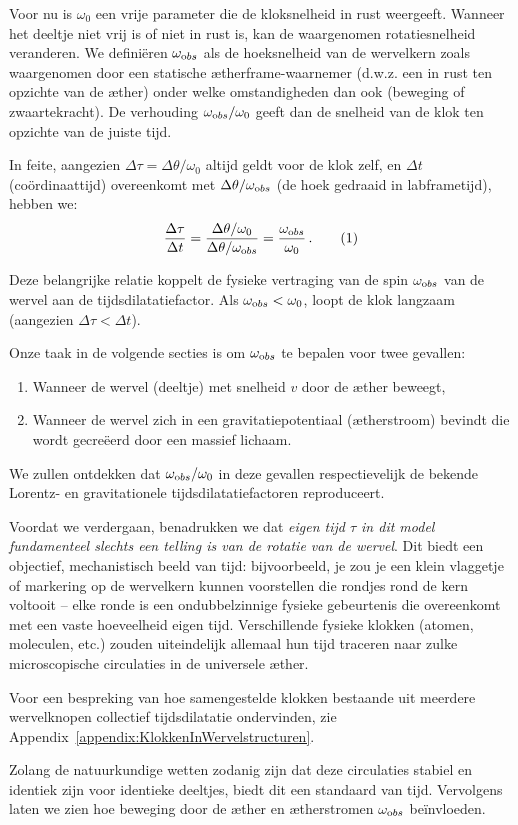 Voor nu is $\omega_0$ een vrije parameter die de kloksnelheid in rust weergeeft. Wanneer het deeltje niet vrij is of niet in rust is, kan de waargenomen rotatiesnelheid veranderen. We definiëren $\omega_{\textrm obs}$ als de hoeksnelheid van de wervelkern zoals waargenomen door een statische ætherframe-waarnemer (d.w.z. een in rust ten opzichte van de æther) onder welke omstandigheden dan ook (beweging of zwaartekracht). De verhouding $\omega_{\textrm obs}/\omega_0$ geeft dan de snelheid van de klok ten opzichte van de juiste tijd.

In feite, aangezien $\Delta \tau = \Delta \theta / \omega_0$ altijd geldt voor de klok zelf, en $\Delta t$ (coördinaattijd) overeenkomt met $\Delta \theta / \omega_{\textrm obs}$ (de hoek gedraaid in labframetijd), hebben we:
\[
    \frac{\Delta \tau}{\Delta t} = \frac{\Delta \theta / \omega_0}{\Delta \theta / \omega_{\textrm obs}} = \frac{\omega_{\textrm obs}}{\omega_0} \,. \tag{1}
\]

Deze belangrijke relatie koppelt de fysieke vertraging van de spin $\omega_{\textrm obs}$ van de wervel aan de tijdsdilatatiefactor. Als $\omega_{\textrm obs} < \omega_0$, loopt de klok langzaam (aangezien $\Delta \tau < \Delta t$).

Onze taak in de volgende secties is om $\omega_{\textrm obs}$ te bepalen voor twee gevallen:
\begin{enumerate}
    \item Wanneer de wervel (deeltje) met snelheid $v$ door de æther beweegt,
    \item Wanneer de wervel zich in een gravitatiepotentiaal (ætherstroom) bevindt die wordt gecreëerd door een massief lichaam.
\end{enumerate}
We zullen ontdekken dat $\omega_{\textrm obs}/\omega_0$ in deze gevallen respectievelijk de bekende Lorentz- en gravitationele tijdsdilatatiefactoren reproduceert.

Voordat we verdergaan, benadrukken we dat \emph{eigen tijd $\tau$ in dit model fundamenteel slechts een telling is van de rotatie van de wervel}. Dit biedt een objectief, mechanistisch beeld van tijd: bijvoorbeeld, je zou je een klein vlaggetje of markering op de wervelkern kunnen voorstellen die rondjes rond de kern voltooit – elke ronde is een ondubbelzinnige fysieke gebeurtenis die overeenkomt met een vaste hoeveelheid eigen tijd. Verschillende fysieke klokken (atomen, moleculen, etc.) zouden uiteindelijk allemaal hun tijd traceren naar zulke microscopische circulaties in de universele æther.

Voor een bespreking van hoe samengestelde klokken bestaande uit meerdere wervelknopen collectief tijdsdilatatie ondervinden, zie Appendix~\ref{appendix:KlokkenInWervelstructuren}.

Zolang de natuurkundige wetten zodanig zijn dat deze circulaties stabiel en identiek zijn voor identieke deeltjes, biedt dit een standaard van tijd. Vervolgens laten we zien hoe beweging door de æther en ætherstromen $\omega_{\textrm obs}$ beïnvloeden.